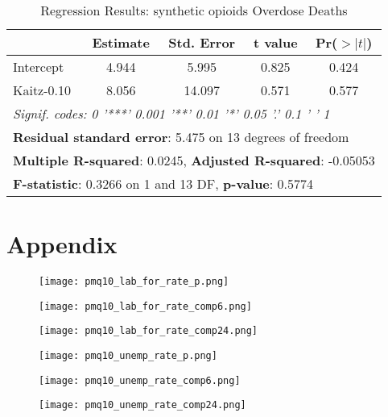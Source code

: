 \documentclass[12pt,a4paper]{article}
\begin{document}
\begin{table}[ht]
    \centering
    \begin{tabular}{lcccc}
    \toprule
     & \textbf{Estimate} & \textbf{Std. Error} & \textbf{t value} & \textbf{Pr($>|t|$)} \\
    \midrule
    Intercept  & 4.944 & 5.995 & 0.825 & 0.424 \\
    Kaitz-0.10 & 8.056 & 14.097 & 0.571 & 0.577 \\
    \midrule
    \multicolumn{5}{l}{\textit{Signif. codes:  0 '***' 0.001 '**' 0.01 '*' 0.05 '.' 0.1 ' ' 1}} \\
    \midrule
    \multicolumn{5}{l}{\textbf{Residual standard error}: 5.475 on 13 degrees of freedom} \\
    \multicolumn{5}{l}{\textbf{Multiple R-squared}: 0.0245, \textbf{Adjusted R-squared}: -0.05053} \\
    \multicolumn{5}{l}{\textbf{F-statistic}: 0.3266 on 1 and 13 DF, \textbf{p-value}: 0.5774} \\
    \bottomrule
    \end{tabular}
    \caption{Regression Results: synthetic opioids Overdose Deaths}
    \label{tab:regression_results_synthetic}
\end{table}

\newpage

\section*{Appendix}

\begin{figure}[htbp]
    \centering
    \texttt{[image: pmq10\_lab\_for\_rate\_p.png]}
    \caption{}
    \label{fig:lab_for_rate_p}
\end{figure}

\begin{figure}[htbp]
    \centering
    \texttt{[image: pmq10\_lab\_for\_rate\_comp6.png]}
    \caption{}
    \label{fig:lab_for_rate_comp6}
\end{figure}

\begin{figure}[htbp]
    \centering
    \texttt{[image: pmq10\_lab\_for\_rate\_comp24.png]}
    \caption{}
    \label{fig:lab_for_rate_comp24}
\end{figure}

\begin{figure}[htbp]
    \centering
    \texttt{[image: pmq10\_unemp\_rate\_p.png]}
    \caption{}
    \label{fig:unemp_rate_p}
\end{figure}

\begin{figure}[htbp]
    \centering
    \texttt{[image: pmq10\_unemp\_rate\_comp6.png]}
    \caption{}
    \label{fig:unemp_rate_comp6}
\end{figure}

\begin{figure}[htbp]
    \centering
    \texttt{[image: pmq10\_unemp\_rate\_comp24.png]}
    \caption{}
    \label{fig:unemp_rate_comp24}
\end{figure}
\end{document}
